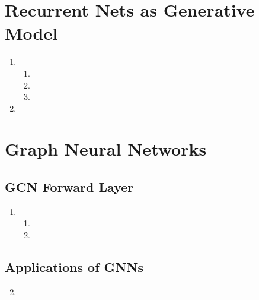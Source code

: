 \documentclass{article}
\begin{document}
\section{Recurrent Nets as Generative Model}

\begin{enumerate}[label=\textbf{2.\arabic*}]
  \item

  \begin{enumerate}[label=\textbf{(\alph*)}]
    \item
    \item
    \item
  \end{enumerate}

  \item
\end{enumerate}

\section{Graph Neural Networks}

\subsection{GCN Forward Layer}

\begin{enumerate}[label=\textbf{3.\arabic*}]
  \item

  \begin{enumerate}[label=\textbf{(\alph*)}]
    \item
    \item
  \end{enumerate}
\end{enumerate}

\subsection{Applications of GNNs}

\begin{enumerate}[label=\textbf{3.\arabic*}]
  \setcounter{enumi}{1}
  \item
\end{enumerate}

\end{document}
